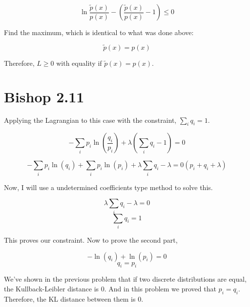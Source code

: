 \documentclass[12pt, letterpaper]{article}
\begin{document}
\begin{equation}
 \ln \frac{\tilde{p}(x)}{p(x)} - (\frac{\tilde{p}(x)}{p(x)}-1)  \leq 0
\end{equation}

Find the maximum, which is identical to what was done above:

\begin{equation}
\tilde{p}(x) = p(x)
\end{equation}

Therefore, $L \geq 0$ with equality if $\tilde{p}(x) = p(x)$.

\section*{Bishop 2.11}
Applying the Lagrangian to this case with the constraint, $\sum_i q_i = 1$. 

\begin{equation}
- \sum_i p_i \ln (\frac{q_i}{p_i}) + \lambda (\sum_i q_i - 1) = 0
\end{equation}

\begin{equation}
- \sum_i p_i \ln(q_i) + \sum_i p_i \ln(p_i) + \lambda \sum_i q_i - \lambda = 0 (p_i + q_i + \lambda)
\end{equation}

Now, I will use a undetermined coefficients type method to solve this.

\begin{equation}
\lambda \sum_i q_i - \lambda = 0
\end{equation}
\begin{equation}
\sum_i q_i = 1
\end{equation}

This proves our constraint. Now to prove the second part, 

\begin{equation}
-\ln (q_i) + \ln (p_i) = 0
\end{equation}
\begin{equation}
q_i = p_i
\end{equation}

We've shown in the previous problem that if two discrete distributions are equal, the Kullback-Leibler distance is 0. And in this problem we proved that $p_i = q_i$. Therefore, the KL distance between them is 0.
\end{document}
